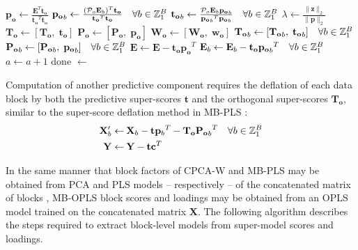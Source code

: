 \begin{algorithm}[H]
\begin{algorithmic}[1]
  \STATE $\mathbf{p_o} \gets \tfrac{\mathbf{E}^T \mathbf{t_o}}
                                   {\mathbf{t_o}^T \mathbf{t_o}}$
  \STATE $\mathbf{p_o}_b \gets
          \tfrac{(\mathcal{P}_o \mathbf{E}_b)^T \mathbf{t_o}}
                {\mathbf{t_o}^T \mathbf{t_o}}
          \quad \forall b \in \mathbb{Z}_{1}^{B}$
  \STATE $\mathbf{t_o}_b \gets
          \tfrac{\mathcal{P}_o \mathbf{E}_b \mathbf{p_o}_b}
                {{\mathbf{p_o}_b}^T \mathbf{p_o}_b}
          \quad \forall b \in \mathbb{Z}_{1}^{B}$
  \STATE $\lambda \gets \tfrac{\| \mathbf{z} \|_2}{\| \mathbf{p} \|_2}$
    \STATE $\mathbf{T_o} \gets [\mathbf{T_o}, \; \mathbf{t_o}]$
    \STATE $\mathbf{P_o} \gets [\mathbf{P_o}, \; \mathbf{p_o}]$
    \STATE $\mathbf{W_o} \gets [\mathbf{W_o}, \; \mathbf{w_o}]$
    \STATE $\mathbf{T_o}_b \gets [\mathbf{T_o}_b, \; \mathbf{t_o}_b]
            \quad \forall b \in \mathbb{Z}_{1}^{B}$
    \STATE $\mathbf{P_o}_b \gets [\mathbf{P_o}_b, \; \mathbf{p_o}_b]
            \quad \forall b \in \mathbb{Z}_{1}^{B}$
    \STATE $\mathbf{E} \gets \mathbf{E} - \mathbf{t_o} \mathbf{p_o}^T$
    \STATE $\mathbf{E}_b \gets \mathbf{E}_b - \mathbf{t_o} {\mathbf{p_o}_b}^T
            \quad \forall b \in \mathbb{Z}_{1}^{B}$
    \STATE $a \gets a + 1$
  \ELSE
    \STATE done $\gets$ \TRUE
  \ENDIF
\ENDWHILE
\end{algorithmic}
\end{algorithm}
\newpage

\begin{doublespace}
Computation of another predictive component requires the deflation of each
data block by both the predictive super-scores $\mathbf{t}$ and the
orthogonal super-scores $\mathbf{T_o}$, similar to the super-score deflation
method in MB-PLS \cite{westerhuis:jchemo1997}:
\begin{align}
\mathbf{X}_b' \gets& \: \mathbf{X}_b -
 \mathbf{t} {\mathbf{p}_b}^T -
 \mathbf{T_o} {\mathbf{P_o}_b}^T
 \quad \forall b \in \mathbb{Z}_{1}^{B} \\
\mathbf{Y} \gets& \: \mathbf{Y} - \mathbf{t} \mathbf{c}^T
\end{align}

In the same manner that block factors of CPCA-W and MB-PLS may be obtained from
PCA and PLS models -- respectively -- of the concatenated matrix of blocks
\cite{westerhuis:jchemo1998,smilde:jchemo2003}, MB-OPLS block scores and
loadings may be obtained from an OPLS model trained on the concatenated
matrix $\mathbf{X}$. The following algorithm describes the steps required
to extract block-level models from super-model scores and loadings.
\end{doublespace}

